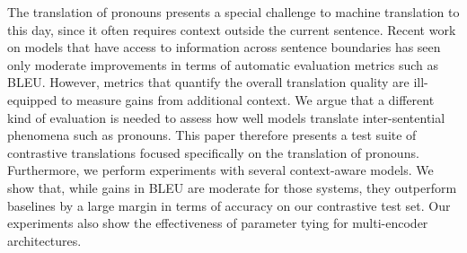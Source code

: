 The translation of pronouns presents a special challenge to machine translation to this day, since it often requires context outside the current sentence. Recent work on models that have access to information across sentence boundaries has seen only moderate improvements in terms of automatic evaluation metrics such as BLEU. However, metrics that quantify the overall translation quality are ill-equipped to measure gains from additional context. We argue that a different kind of evaluation is needed to assess how well models translate inter-sentential phenomena such as pronouns. This paper therefore presents a test suite of contrastive translations focused specifically on the translation of pronouns. Furthermore, we perform experiments with several context-aware models. We show that, while gains in BLEU are moderate for those systems, they outperform baselines by a large margin in terms of accuracy on our contrastive test set. Our experiments also show the effectiveness of parameter tying for multi-encoder architectures.
